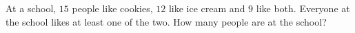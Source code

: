 At a school, $15$ people like cookies, $12$ like ice cream and $9$ like both. Everyone at the school likes at least one of the two. How many people are at the school?
